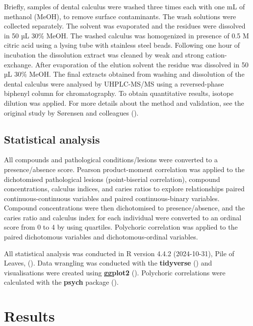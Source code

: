 \documentclass[
  11pt,
  leqno]{scrartcl}
\begin{document}
Briefly, samples of dental calculus were washed three times each with
one mL of methanol (MeOH), to remove surface contaminants. The wash
solutions were collected separately. The solvent was evaporated and the
residues were dissolved in 50 µL 30\% MeOH. The washed calculus was
homogenized in presence of 0.5 M citric acid using a lysing tube with
stainless steel beads. Following one hour of incubation the dissolution
extract was cleaned by weak and strong cation-exchange. After
evaporation of the elution solvent the residue was dissolved in 50 µL
30\% MeOH. The final extracts obtained from washing and dissolution of
the dental calculus were analysed by UHPLC-MS/MS using a reversed-phase
biphenyl column for chromatography. To obtain quantitative results,
isotope dilution was applied. For more details about the method and
validation, see the original study by Sørensen and colleagues
().

\subsection{Statistical analysis}\label{statistical-analysis}

All compounds and pathological conditions/lesions were converted to a
presence/absence score. Pearson product-moment correlation was applied
to the dichotomised pathological lesions (point-biserial correlation),
compound concentrations, calculus indices, and caries ratios to explore
relationships paired continuous-continuous variables and paired
continuous-binary variables. Compound concentrations were then
dichotomised to presence/absence, and the caries ratio and calculus
index for each individual were converted to an ordinal score from 0 to 4
by using quartiles. Polychoric correlation was applied to the paired
dichotomous variables and dichotomous-ordinal variables.

All statistical analysis was conducted in R version 4.4.2 (2024-10-31),
Pile of Leaves, (). Data
wrangling was conducted with the \textbf{tidyverse}
() and visualisations
were created using \textbf{ggplot2} (). Polychoric correlations were calculated with the \textbf{psych}
package ().

\section{Results}\label{results}
\end{document}
